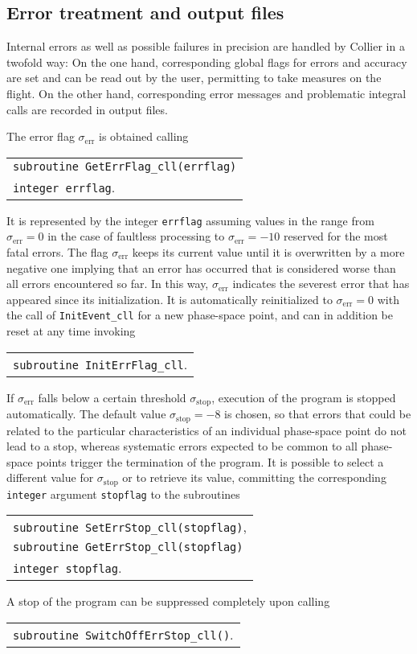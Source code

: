 \documentclass[preprint,sort&compress,12pt]{elsarticle}
\makeatletter
\def\bce{\begin{center}}
\def\ece{\end{center}}
\newcommand{\collier}{{\sc Collier}}
\newlength{\parwidth}\newlength{\colonewidth}%
\newcommand{\cpcsub}[1]
{%
\setlength{\parwidth}{\textwidth}\addtolength{\parwidth}{-2.1em}%
\bce
\begin{tabular}[t]{@{}p{\parwidth}@{}}
#1
\end{tabular}
\ece
}%
\makeatother
\begin{document}
\subsection{Error treatment and output files}
\label{subsec:ErrOut}
Internal errors as well as possible failures in precision are handled by {\collier} in a twofold way: On the one hand,
corresponding global flags for errors and accuracy are set and can be read out by the user, permitting to take measures on the flight.
On the other hand, corresponding error messages and problematic integral calls are recorded in output files.

The error flag $\sigma_\textrm{err}$ is obtained calling
\cpcsub{
{\tt subroutine  GetErrFlag\_cll(errflag)}\\
{\tt integer errflag}\;. \\
}
It is represented by the integer {\tt errflag} assuming values in the
range from $\sigma_\textrm{err}=0$ in the case of faultless processing
to $\sigma_\textrm{err}=-10$ reserved for the most fatal errors.  The
flag $\sigma_\textrm{err}$ keeps its current value until it is
overwritten by a more negative one implying that an error has occurred
that is considered worse than all errors encountered so far. In this
way, $\sigma_\textrm{err}$ indicates the severest error that has
appeared since its initialization. It is automatically reinitialized
to $\sigma_\textrm{err}=0$ with the call of {\tt InitEvent\_cll} for a
new phase-space point, and can in addition be reset at any time
invoking 
\cpcsub{ {\tt subroutine InitErrFlag\_cll}\;.  }  
If $\sigma_\textrm{err}$ falls below a certain threshold
$\sigma_\textrm{stop}$, execution of the program is stopped
automatically.  The default value $\sigma_\textrm{stop}=-8$ is chosen,
so that errors that could be related to the particular characteristics
of an individual phase-space point do not lead to a stop, whereas
systematic errors expected to be common to all phase-space points trigger
the termination of the program. It is possible to select a different
value for $\sigma_\textrm{stop}$ or to retrieve its value, committing 
the corresponding {\tt integer}
argument {\tt stopflag} to the subroutines
\cpcsub{
{\tt subroutine  SetErrStop\_cll(stopflag)}\;,\\
{\tt subroutine  GetErrStop\_cll(stopflag)}\\
{\tt integer stopflag}\;. \\
}
A stop of the program can be suppressed completely upon calling
\cpcsub{
{\tt subroutine  SwitchOffErrStop\_cll()}\;.\\
}
\end{document}
